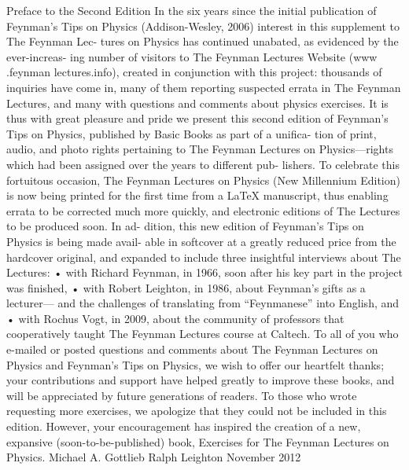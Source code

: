 \documentclass[11pt,oneside]{article}
\begin{document}
\label{tips-sec-1-preface-to-the-second-edition}


Preface to the Second Edition In the six years since the initial publication of Feynman’s Tips on Physics (Addison-Wesley, 2006) interest in this supplement to The Feynman Lec- tures on Physics has continued unabated, as evidenced by the ever-increas- ing number of visitors to The Feynman Lectures Website (www .feynman lectures.info), created in conjunction with this project: thousands of inquiries have come in, many of them reporting suspected errata in The Feynman Lectures, and many with questions and comments about physics exercises. It is thus with great pleasure and pride we present this second edition of Feynman’s Tips on Physics, published by Basic Books as part of a unifica- tion of print, audio, and photo rights pertaining to The Feynman Lectures on Physics---rights which had been assigned over the years to different pub- lishers. To celebrate this fortuitous occasion, The Feynman Lectures on Physics (New Millennium Edition) is now being printed for the first time from a LaTeX manuscript, thus enabling errata to be corrected much more quickly, and electronic editions of The Lectures to be produced soon. In ad- dition, this new edition of Feynman’s Tips on Physics is being made avail- able in softcover at a greatly reduced price from the hardcover original, and expanded to include three insightful interviews about The Lectures: • with Richard Feynman, in 1966, soon after his key part in the project was finished, • with Robert Leighton, in 1986, about Feynman’s gifts as a lecturer--- and the challenges of translating from “Feynmanese” into English, and • with Rochus Vogt, in 2009, about the community of professors that cooperatively taught The Feynman Lectures course at Caltech. To all of you who e-mailed or posted questions and comments about The Feynman Lectures on Physics and Feynman’s Tips on Physics, we wish to offer our heartfelt thanks; your contributions and support have helped greatly to improve these books, and will be appreciated by future generations of readers. To those who wrote requesting more exercises, we apologize that they could not be included in this edition. However, your encouragement has inspired the creation of a new, expansive (soon-to-be-published) book, Exercises for The Feynman Lectures on Physics. Michael A. Gottlieb Ralph Leighton November 2012\par
\end{document}
